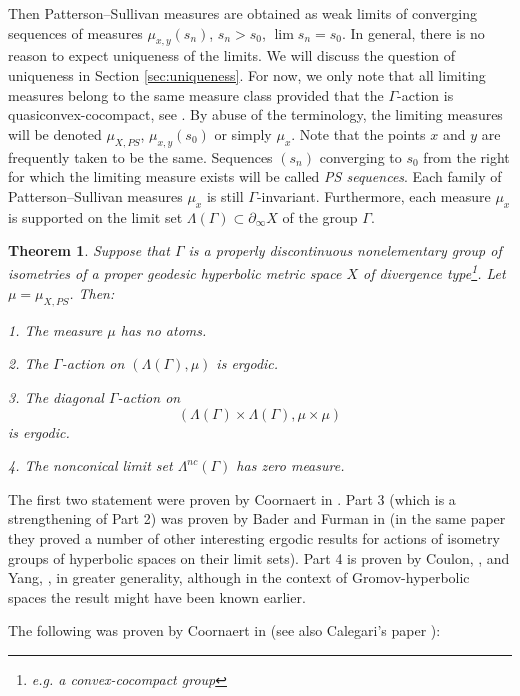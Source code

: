 \documentclass[12pt]{amsbook}%
\newtheorem{thm}{Theorem}[chapter]
\theoremstyle{definition}
\theoremstyle{remark}
\numberwithin{section}{chapter}
\numberwithin{subsection}{section}
\numberwithin{figure}{chapter}
\def\Ga{\Gamma}
\def\La{\Lambda}
\def\geo{\partial_\infty}
\begin{document}
{{Then Patterson--Sullivan measures are obtained as weak limits of converging sequences of measures 
$\mu_{x,y}(s_n)$, $s_n>s_0$, $\lim s_n=s_0$. In general, there is no reason to expect uniqueness of the limits. We will discuss 
the question of uniqueness in Section \ref{sec:uniqueness}. For now, we only note that all limiting measures 
belong to the same measure class provided that the $\Ga$-action is quasiconvex-cocompact, see \cite{Coo93}. By abuse of the terminology, 
the limiting measures will be denoted 
$\mu_{X,PS}$, $\mu_{x,y}(s_0)$ or simply $\mu_x$.  Note that the points $x$ and $y$ 
are frequently taken to be the same. 
Sequences $(s_n)$ converging to $s_0$ from the right for which the limiting measure exists will be called {\em PS sequences}. 
Each family of Patterson--Sullivan measures $\mu_x$ is still $\Ga$-invariant. 
Furthermore, each measure $\mu_x$ is supported on the limit set $\La(\Ga)\subset \geo X$ of the group $\Ga$.  

\begin{thm}\label{thm:ergodic}
Suppose that $\Ga$ is a properly discontinuous nonelementary  group of isometries of a proper geodesic hyperbolic metric space $X$ of divergence type\footnote{e.g. a convex-cocompact group}. Let $\mu=\mu_{X,PS}$. Then:

1. The measure $\mu$ has no atoms. 

2. The $\Ga$-action on $(\La(\Ga), \mu)$ is ergodic. 

3. The diagonal $\Ga$-action  on 
$$(\La(\Ga)\times \La(\Ga), \mu\times \mu)$$ 
is ergodic. 

4. The nonconical limit set $\La^{nc}(\Ga)$ has zero measure.  
\end{thm}

The first two statement were proven by Coornaert in \cite{Coo93}. Part 3 (which is a strengthening of Part 2) was proven by Bader and Furman in \cite{BF} (in the same paper they proved a number of other interesting ergodic results for actions of isometry groups of hyperbolic spaces on their limit sets). Part 4 is proven by Coulon, \cite{COULON2024}, and Yang, \cite{yang2023conformaldynamicsinfinitygroups},  in greater generality, although in the context of Gromov-hyperbolic spaces the result might have been known earlier. 

The following was proven by Coornaert in \cite[Corollary 7.5]{Coo93} (see also Calegari's paper \cite[Corollary 2.5.10]{Calegari}):

}}
\end{document}

